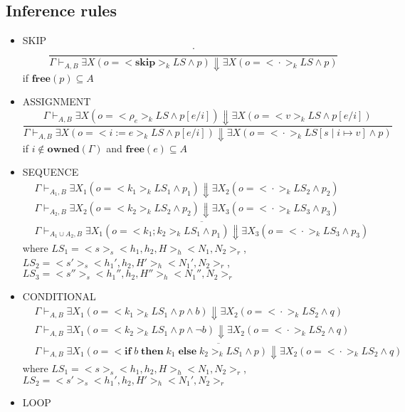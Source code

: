 \documentclass{lmcs} %
\theoremstyle{plain}\newtheorem{satz}[thm]{Satz} %
\begin{document}
\subsection*{Inference rules}
\begin{itemize}
\item SKIP
  $$\dfrac{\cdot}{\Gamma \vdash_{A,B} \exists X(o=<\!\!\mathbf{skip}\!\!>_k LS \land p)\Downarrow \exists X(o=<\!\!\cdot\!\!>_k LS \land p)}$$
  if $\mathbf{free}(p)\subseteq A$
\item ASSIGNMENT
  $$\dfrac{\Gamma \vdash_{A,B} \exists X(o=<\!\!\rho_e\!\!>_k LS\land p[e/i])\Downarrow \exists X(o=<\!\!v\!\!>_k LS\land p[e/i])}{\Gamma \vdash_{A,B} \exists X(o=<\!\!i:=e\!\!>_k LS\land p[e/i])\Downarrow \exists X(o=<\!\!\cdot\!\!>_k LS[s\mid i\mapsto v]\land p)}$$
   if $i\notin \mathbf{owned}(\Gamma)$ and $\mathbf{free}(e)\subseteq A$
\item SEQUENCE
  \begin{align*}
   &\Gamma \vdash_{A_1,B} \exists X_1(o=<\!\!k_1\!\!>_k LS_1\land p_1)\Downarrow\exists X_2(o=<\!\!\cdot\!\!>_k LS_2 \land p_2)\\
   &\Gamma \vdash_{A_2,B} \exists X_2(o=<\!\!k_2\!\!>_k LS_2 \land p_2)\Downarrow\exists X_3(o=<\!\!\cdot\!\!>_k LS_3 \land p_3)\\
   &\overline{\Gamma \vdash_{A_1\cup A_2, B} \exists X_1 (o=<\!\!k_1;k_2\!\!>_k LS_1\land p_1)\Downarrow\exists X_3 (o=<\!\!\cdot\!\!>_k LS_3\land p_3)}
\end{align*}
where $LS_1=<\!\!s\!\!>_s<\!\!h_1,h_2,H\!\!>_h<\!\!N_1,N_2\!\!>_r$, $LS_2=<\!\!s'\!\!>_s<\!\!h_1',h_2,H'\!\!>_h<\!\!N_1',N_2\!\!>_r$,
$LS_3=<\!\!s''\!\!>_s<\!\!h_1'',h_2,H''\!\!>_h<\!\!N_1'',N_2\!\!>_r$
\item CONDITIONAL
\begin{align*}
   &\Gamma \vdash_{A,B} \exists X_1(o=<\!\!k_1\!\!>_k LS_1\land p\land b )\Downarrow\exists X_2(o=<\!\!\cdot\!\!>_k LS_2\land q)\\
   &\Gamma \vdash_{A,B} \exists X_1(o=<\!\!k_2\!\!>_k LS_1\land p\land \neg b)\Downarrow\exists X_2(o=<\!\!\cdot\!\!>_k LS_2\land q)\\
   &\overline{\Gamma \vdash_{A, B} \exists X_1 (o=<\!\!\mathbf{if}\;b\;\mathbf{then}\;k_1\;\mathbf{else}\;k_2\!\!>_k LS_1\land p)\Downarrow\exists X_2 (o=<\!\!\cdot\!\!>_k LS_2\land q)}
\end{align*}
where $LS_1=<\!\!s\!\!>_s<\!\!h_1,h_2,H\!\!>_h<\!\!N_1,N_2\!\!>_r$, $LS_2=<\!\!s'\!\!>_s<\!\!h_1',h_2,H'\!\!>_h<\!\!N_1',N_2\!\!>_r$
\item LOOP

\end{itemize}
\end{document}
